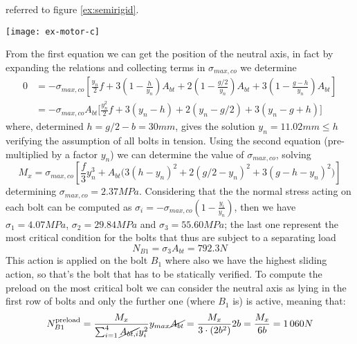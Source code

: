 \begin{enumerate}[a)]
		referred to figure \ref{ex:semirigid}.
		\begin{SCfigure}[2][bt]
			\centering \texttt{[image: ex-motor-c]}
			\caption{ scheme used to compute the solution of the non-preloaded semi-rigid members problem. } \label{ex:semirigid}
		\end{SCfigure}
		From the first equation we can get the position of the neutral axis, in fact by expanding the relations and collecting terms in $\sigma_{max,co}$ we determine
		\begin{align*}
			0 & = -\sigma_{max,co} \left[ \frac {y_n}2 f + 3 \left(1 - \frac{h}{y_n} \right) A_{bt} + 2 \left(1 - \frac{g/2}{y_n} \right) A_{bt}+ 3 \left(1 - \frac{g-h}{y_n} \right) A_{bt}  \right] \\
			& = -\sigma_{max,co} A_{bt} \Big[  \frac{y_n^2}{2}f + 3(y_n - h) + 2 (y_n - g/2) + 3(y_n - g+h) \Big] 
		\end{align*}
		where, determined $h = g/2-b = 30mm$, gives the solution $y_n = 11.02 mm \leq h$ verifying the assumption of all bolts in tension. Using the second equation (pre-multiplied by a factor $y_n$) we can determine the value of $\sigma_{max,co}$, solving 
		\[ M_x = \sigma_{max,co} \left[ \frac f 3 y_n^3 + A_{bt} \Big( 3(h-y_n)^2 + 2 (g/2-y_n)^2 + 3(g-h-y_n)^2 \Big)  \right]  \]
		determining $\sigma_{max,co} = 2.37MPa$. Considering that the the normal stress acting on each bolt can be computed as $\sigma_i = - \sigma_{max,co} \left(1 - \frac{y_i}{y_n}\right)$, then we have $\sigma_1 = 4.07MPa$, $\sigma_2 = 29.84MPa$ and $\sigma_3 = 55.60MPa$; the last one represent the most critical condition for the bolts that thus are subject to a separating load
		\[ N_{B1} = \sigma_3 A_{bt} = 792.3 N \]
		This action is applied on the bolt $B_1$ where also we have the highest sliding action, so that's the bolt that has to be statically verified. To compute the preload on the most critical bolt we can consider  the neutral axis as lying in the first row of bolts and only the further one (where $B_1$ is) is active, meaning that:
		\[ N_{B1}^\textrm{preload} = \frac{M_x}{\sum_{i=1}^4 \cancel{A_{bt,i}} y_i^2} y_{max} \cancel{A_{bt}} = \frac{M_x}{3 \cdot (2b^2)} 2b = \frac{M_x}{6b} = 1\,060 N \]
		

\end{enumerate}
